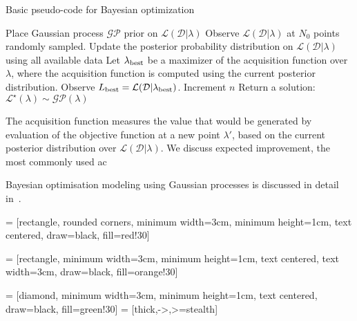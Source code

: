 \documentclass[twocolumn]{aastex631}
\newcommand{\Lmain}{\ensuremath{\mathcal{L}(\mathcal{D}|\lambda)}\xspace}
\newcommand{\Lsurr}{\ensuremath{\mathcal{L}^{\star}(\lambda)}\xspace}
\begin{document}
\begin{algorithm}
\caption{Basic pseudo-code for Bayesian optimization}
\label{alg:BayesOpt}
\begin{algorithmic}[1] %
    \STATE Place Gaussian process $\mathcal{GP}$ prior on $\Lmain$
    \STATE Observe $\Lmain$ at $N_0$ points randomly sampled.
        \STATE Update the posterior probability distribution on $\Lmain$ using all available data
        \STATE Let $\lambda_{\rm best}$ be a maximizer of the acquisition function over $\lambda$, where the acquisition function is computed using the current posterior distribution.
        \STATE Observe $L_{\rm best} = \mathcal{L}(\mathcal{D}|\lambda_{\rm best})$.
        \STATE Increment $n$
    \ENDWHILE
    \STATE Return a solution: $\Lsurr \sim \mathcal{GP}(\lambda)$
\end{algorithmic}
\end{algorithm}


The acquisition function measures the value that would be generated by
evaluation of the objective function at a new point $\lambda'$, based on the current posterior distribution over \Lmain. We discuss expected improvement, the most commonly used ac

Bayesian optimisation modeling using Gaussian processes is discussed in detail in~\cite{}.

 = [rectangle, rounded corners, 
minimum width=3cm, 
minimum height=1cm,
text centered, 
draw=black, 
fill=red!30]


 = [rectangle, 
minimum width=3cm, 
minimum height=1cm, 
text centered, 
text width=3cm, 
draw=black, 
fill=orange!30]

 = [diamond, 
minimum width=3cm, 
minimum height=1cm, 
text centered, 
draw=black, 
fill=green!30]
 = [thick,->,>=stealth]

\end{document}
